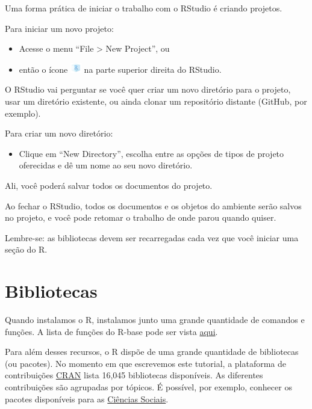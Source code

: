\documentclass[
  10pt,
  brazil,
  a4paper,
  twoside, notitlepage, openright]{book}
\providecommand{\tightlist}{%
  \setlength{\itemsep}{0pt}\setlength{\parskip}{0pt}}
\begin{document}
Uma forma prática de iniciar o trabalho com o RStudio é criando projetos.

Para iniciar um novo projeto:

\begin{itemize}
\tightlist
\item
  Acesse o menu ``File \textgreater{} New Project'', ou
\item
  então o ícone \includegraphics{img/proj_ico.png} na parte superior direita do RStudio.
\end{itemize}

O RStudio vai perguntar se você quer criar um novo diretório para o projeto, usar um diretório existente, ou ainda clonar um repositório distante (GitHub, por exemplo).

Para criar um novo diretório:

\begin{itemize}
\tightlist
\item
  Clique em ``New Directory'', escolha entre as opções de tipos de projeto oferecidas e dê um nome ao seu novo diretório.
\end{itemize}

Ali, você poderá salvar todos os documentos do projeto.

Ao fechar o RStudio, todos os documentos e os objetos do ambiente serão salvos no projeto, e você pode retomar o trabalho de onde parou quando quiser.

Lembre-se: as bibliotecas devem ser recarregadas cada vez que você iniciar uma seção do R.

\hypertarget{biblio}{%
\chapter{Bibliotecas}\label{biblio}}

Quando instalamos o R, instalamos junto uma grande quantidade de comandos e funções. A lista de funções do R-base pode ser vista \href{https://stat.ethz.ch/R-manual/R-devel/library/base/html/00Index.html}{aqui}.

Para além desses recursos, o R dispõe de uma grande quantidade de bibliotecas (ou pacotes). No momento em que escrevemos este tutorial, a plataforma de contribuições \href{https://cran.r-project.org/web/packages/}{CRAN} lista 16,045 bibliotecas disponíveis. As diferentes contribuições são agrupadas por tópicos. É possível, por exemplo, conhecer os pacotes disponíveis para as \href{https://cran.r-project.org/web/views/SocialSciences.html}{Ciências Sociais}.
\end{document}

